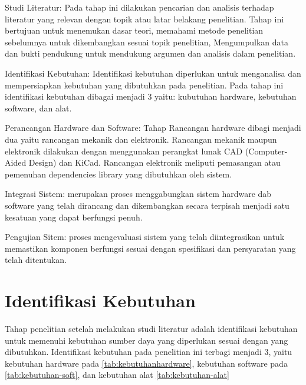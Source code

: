 \begin{packed_enum}
	\item Studi Literatur: Pada tahap ini dilakukan pencarian dan analisis terhadap literatur yang relevan dengan topik atau latar belakang penelitian. Tahap ini bertujuan untuk menemukan dasar teori, memahami metode penelitian sebelumnya untuk dikembangkan sesuai topik penelitian, Mengumpulkan data dan bukti pendukung untuk mendukung argumen dan analisis dalam penelitian.
	\item Identifikasi Kebutuhan: Identifikasi kebutuhan diperlukan untuk menganalisa dan mempersiapkan kebutuhan yang dibutuhkan pada penelitian. Pada tahap ini identifikasi kebutuhan dibagai menjadi 3 yaitu: kubutuhan hardware, kebutuhan software, dan alat.
	\item Perancangan Hardware dan Software: Tahap Rancangan hardware dibagi menjadi dua yaitu rancangan mekanik dan elektronik. Rancangan mekanik maupun elektronik dilakukan dengan menggunakan perangkat lunak CAD (Computer-Aided Design) dan KiCad. Rancangan elektronik meliputi pemasangan atau pemenuhan dependencies library yang dibutuhkan oleh sistem.
	\item Integrasi Sistem: merupakan proses menggabungkan sistem hardware dab software yang telah dirancang dan dikembangkan secara terpisah menjadi satu kesatuan yang dapat berfungsi penuh.
	\item Pengujian Sitem: proses mengevaluasi sistem yang telah diintegrasikan untuk memastikan komponen berfungsi sesuai dengan spesifikasi dan persyaratan yang telah ditentukan.
\end{packed_enum}

\section{Identifikasi Kebutuhan}
Tahap penelitian setelah melakukan studi literatur adalah identifikasi kebutuhan untuk memenuhi kebutuhan sumber daya yang diperlukan sesuai dengan yang dibutuhkan. Identifikasi kebutuhan pada penelitian ini terbagi menjadi 3, yaitu kebutuhan hardware pada \cref{tab:kebutuhanhardware}, kebutuhan software pada \cref{tab:kebutuhan-soft}, dan kebutuhan alat \cref{tab:kebutuhan-alat}

